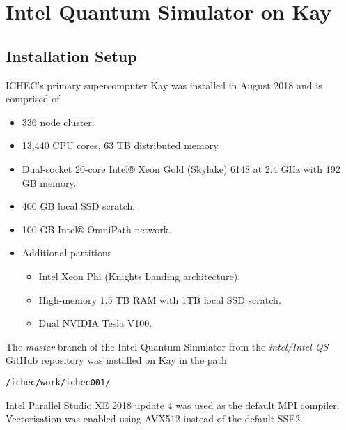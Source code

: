 \section{Intel Quantum Simulator on Kay}
\label{sec:intel_quantum_simulator_on_kay}

\subsection{Installation Setup}
\label{sec:installation_setup}
ICHEC's primary supercomputer Kay was installed in August 2018 and is comprised of
\begin{itemize}
    \item 336 node cluster.
    \item 13,440 CPU cores, 63 TB distributed memory.
    \item Dual-socket 20-core Intel® Xeon Gold (Skylake) 6148 at 2.4 GHz with 192 GB memory.
    \item 400 GB local SSD scratch.
    \item 100 GB Intel® OmniPath network.
    \item Additional partitions
    \begin{itemize}
        \item Intel Xeon Phi (Knights Landing architecture).
        \item High-memory 1.5 TB RAM with 1TB local SSD scratch.
        \item Dual NVIDIA Tesla V100.
    \end{itemize}
\end{itemize}

The \textit{master} branch of the Intel Quantum Simulator from the \textit{intel/Intel-QS} GitHub repository was installed on Kay in the path 
\begin{verbatim}
/ichec/work/ichec001/
\end{verbatim}

 Intel Parallel Studio XE 2018 update 4 was used as the default MPI compiler. Vectorisation was enabled using AVX512 instead of the default SSE2.

